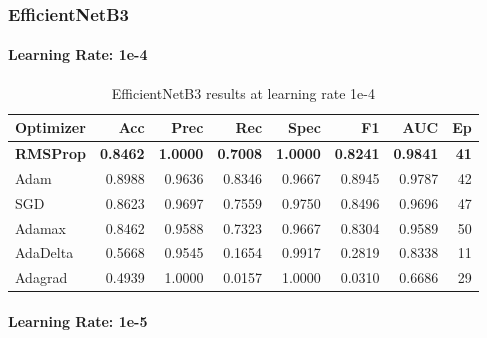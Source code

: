 \subsubsection{EfficientNetB3}
\label{appx:efficientnetb3}

\paragraph{Learning Rate: 1e-4}

\begingroup
\tiny
\setlength{\tabcolsep}{2.5pt}
\begin{table}[H]
  \centering
  \caption{EfficientNetB3 results at learning rate 1e-4}
  \label{tab:efficientnetb3-1e4}
  \begin{tabular}{l r r r r r r r}
    \toprule
    \rowcolor{tableheader}
    \textbf{Optimizer} & \textbf{Acc} & \textbf{Prec} & \textbf{Rec} &
    \textbf{Spec} & \textbf{F1} & \textbf{AUC} & \textbf{Ep} \\
    \midrule
    \textbf{RMSProp}  & \textbf{0.8462} & \textbf{1.0000} & \textbf{0.7008} & \textbf{1.0000} & \textbf{0.8241} & \textbf{0.9841} & \textbf{41} \\
    Adam     & 0.8988 & 0.9636 & 0.8346 & 0.9667 & 0.8945 & 0.9787 & 42 \\
    SGD      & 0.8623 & 0.9697 & 0.7559 & 0.9750 & 0.8496 & 0.9696 & 47 \\
    Adamax   & 0.8462 & 0.9588 & 0.7323 & 0.9667 & 0.8304 & 0.9589 & 50 \\
    AdaDelta & 0.5668 & 0.9545 & 0.1654 & 0.9917 & 0.2819 & 0.8338 & 11 \\
    Adagrad  & 0.4939 & 1.0000 & 0.0157 & 1.0000 & 0.0310 & 0.6686 & 29 \\
    \bottomrule
  \end{tabular}
\end{table}
\endgroup

\paragraph{Learning Rate: 1e-5}

